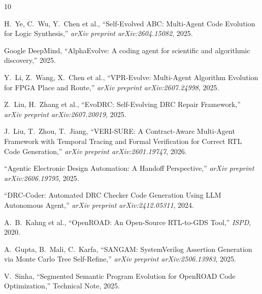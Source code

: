 \documentclass[conference]{IEEEtran}
\begin{document}
\begin{thebibliography}{10}

H.~Ye, C.~Wu, Y.~Chen et al., ``Self-Evolved ABC: Multi-Agent Code Evolution for Logic Synthesis,'' \textit{arXiv preprint arXiv:2604.15082}, 2025.

Google DeepMind, ``AlphaEvolve: A coding agent for scientific and algorithmic discovery,'' 2025.

Y.~Li, Z.~Wang, X.~Chen et al., ``VPR-Evolve: Multi-Agent Algorithm Evolution for FPGA Place and Route,'' \textit{arXiv preprint arXiv:2607.24998}, 2025.

Z.~Liu, H.~Zhang et al., ``EvoDRC: Self-Evolving DRC Repair Framework,'' \textit{arXiv preprint arXiv:2607.20019}, 2025.

J.~Liu, T.~Zhou, T.~Jiang, ``VERI-SURE: A Contract-Aware Multi-Agent Framework with Temporal Tracing and Formal Verification for Correct RTL Code Generation,'' \textit{arXiv preprint arXiv:2601.19747}, 2026.

``Agentic Electronic Design Automation: A Handoff Perspective,'' \textit{arXiv preprint arXiv:2606.19795}, 2025.

``DRC-Coder: Automated DRC Checker Code Generation Using LLM Autonomous Agent,'' \textit{arXiv preprint arXiv:2412.05311}, 2024.

A.~B.~Kahng et al., ``OpenROAD: An Open-Source RTL-to-GDS Tool,'' \textit{ISPD}, 2020.

A.~Gupta, B.~Mali, C.~Karfa, ``SANGAM: SystemVerilog Assertion Generation via Monte Carlo Tree Self-Refine,'' \textit{arXiv preprint arXiv:2506.13983}, 2025.

V.~Sinha, ``Segmented Semantic Program Evolution for OpenROAD Code Optimization,'' Technical Note, 2025.

\end{thebibliography}
\end{document}
